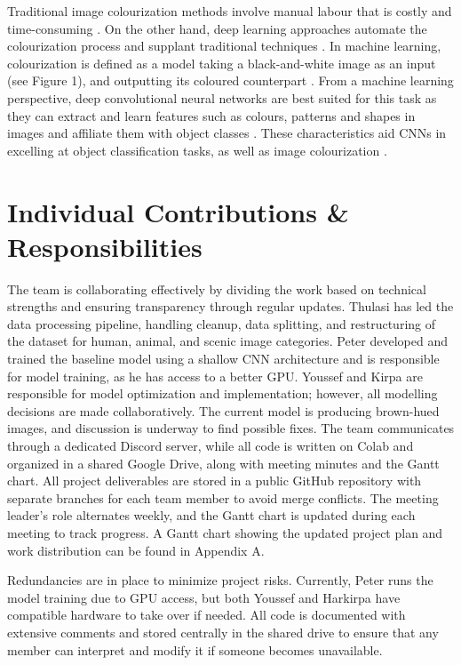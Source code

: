\documentclass{article} %
\begin{document}
Traditional image colourization methods involve manual labour that is costly and time-consuming \citep{farella2022}. On the other hand, deep learning approaches automate the colourization process and supplant traditional techniques \citep{farella2022}. In machine learning, colourization is defined as a model taking a black-and-white image as an input (see Figure 1), and outputting its coloured counterpart \citep{lettherebecolor}. From a machine learning perspective, deep convolutional neural networks are best suited for this task as they can extract and learn features such as colours, patterns and shapes in images and affiliate them with object classes \citep{deepcnn}. These characteristics aid CNNs in excelling at object classification tasks, as well as image colourization \citep{deepcnn}. 

\section{Individual Contributions \& Responsibilities}
The team is collaborating effectively by dividing the work based on technical strengths and ensuring transparency through regular updates. Thulasi has led the data processing pipeline, 
handling cleanup, data splitting, and restructuring of the dataset for human, animal, and scenic image categories. Peter developed and trained the baseline model using a shallow CNN architecture 
and is responsible for model training, as he has access to a better GPU. Youssef and Kirpa are responsible for model optimization and implementation; however, all modelling decisions are made collaboratively. 
The current model is producing brown-hued images, and discussion is underway to find possible fixes. The team communicates through a dedicated Discord server, while all code is written on Colab and organized 
in a shared Google Drive, along with meeting minutes and the Gantt chart. All project deliverables are stored in a public GitHub repository with separate branches for each team member to avoid merge conflicts. 
The meeting leader's role alternates weekly, and the Gantt chart is updated during each meeting to track progress. A Gantt chart showing the updated project plan and work distribution can be found in Appendix A.

Redundancies are in place to minimize project risks. Currently, Peter runs the model training due to GPU access, but both Youssef and Harkirpa have compatible hardware to take over if needed. All code is documented 
with extensive comments and stored centrally in the shared drive to ensure that any member can interpret and modify it if someone becomes unavailable.
\end{document}
